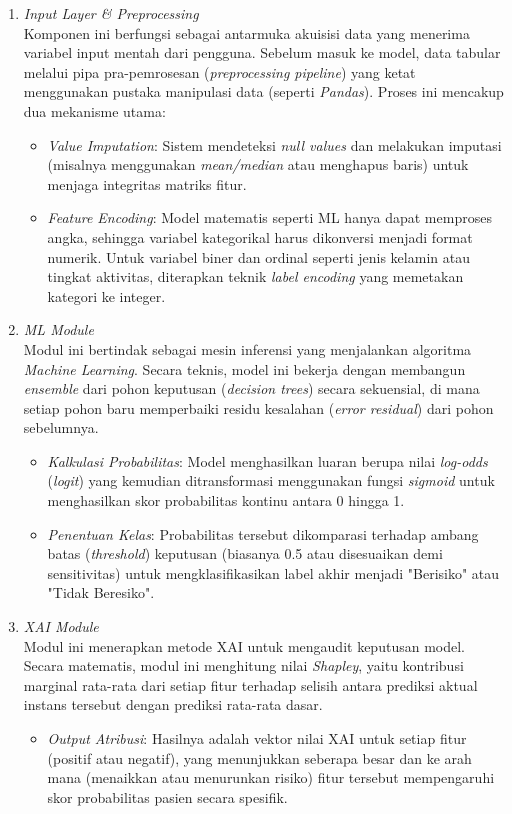 \begin{enumerate}
    \item \textit{Input Layer \& Preprocessing} \\
    Komponen ini berfungsi sebagai antarmuka akuisisi data yang menerima variabel input mentah dari pengguna. Sebelum masuk ke model, data tabular melalui pipa pra-pemrosesan (\textit{preprocessing pipeline}) yang ketat menggunakan pustaka manipulasi data (seperti \textit{Pandas}). Proses ini mencakup dua mekanisme utama:
    \begin{itemize}
        \item \textit{Value Imputation}: Sistem mendeteksi \textit{null values} dan melakukan imputasi (misalnya menggunakan \textit{mean/median} atau menghapus baris) untuk menjaga integritas matriks fitur.
        \item \textit{Feature Encoding}: Model matematis seperti ML hanya dapat memproses angka, sehingga variabel kategorikal harus dikonversi menjadi format numerik. Untuk variabel biner dan ordinal seperti jenis kelamin atau tingkat aktivitas, diterapkan teknik \textit{label encoding} yang memetakan kategori ke integer.
    \end{itemize}

    \item \textit{ML Module} \\
    Modul ini bertindak sebagai mesin inferensi yang menjalankan algoritma \textit{Machine Learning}. Secara teknis, model ini bekerja dengan membangun \textit{ensemble} dari pohon keputusan (\textit{decision trees}) secara sekuensial, di mana setiap pohon baru memperbaiki residu kesalahan (\textit{error residual}) dari pohon sebelumnya.
    \begin{itemize}
        \item \textit{Kalkulasi Probabilitas}: Model menghasilkan luaran berupa nilai \textit{log-odds} (\textit{logit}) yang kemudian ditransformasi menggunakan fungsi \textit{sigmoid} untuk menghasilkan skor probabilitas kontinu antara 0 hingga 1.
        \item \textit{Penentuan Kelas}: Probabilitas tersebut dikomparasi terhadap ambang batas (\textit{threshold}) keputusan (biasanya 0.5 atau disesuaikan demi sensitivitas) untuk mengklasifikasikan label akhir menjadi "Berisiko" atau "Tidak Beresiko".
    \end{itemize}

    \item \textit{XAI Module} \\
    Modul ini menerapkan metode XAI untuk mengaudit keputusan model. Secara matematis, modul ini menghitung nilai \textit{Shapley}, yaitu kontribusi marginal rata-rata dari setiap fitur terhadap selisih antara prediksi aktual instans tersebut dengan prediksi rata-rata dasar.
    \begin{itemize}
        \item \textit{Output Atribusi}: Hasilnya adalah vektor nilai XAI untuk setiap fitur (positif atau negatif), yang menunjukkan seberapa besar dan ke arah mana (menaikkan atau menurunkan risiko) fitur tersebut mempengaruhi skor probabilitas pasien secara spesifik.
    \end{itemize}


\end{enumerate}
